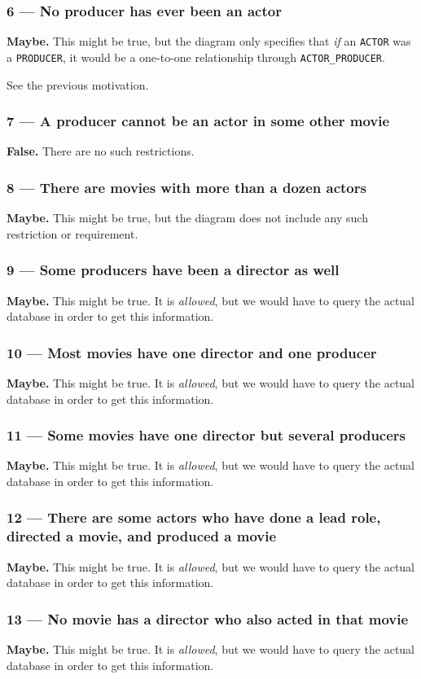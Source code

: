 \subsubsection{6 --- No producer has ever been an actor}
\textbf{Maybe.} This might be true, but the diagram only specifies that
\emph{if} an \texttt{ACTOR} was a \texttt{PRODUCER}, it would be a one-to-one
relationship through \texttt{ACTOR\_PRODUCER}.

See the previous motivation. 

\subsubsection{7 --- A producer cannot be an actor in some other movie}
\textbf{False.} There are no such restrictions.

\subsubsection{8 --- There are movies with more than a dozen actors}
\textbf{Maybe.} This might be true, but the diagram does not include
any such restriction or requirement.

\subsubsection{9 --- Some producers have been a director as well}
\textbf{Maybe.} This might be true. It is \emph{allowed}, but we would have
to query the actual database in order to get this information.

\subsubsection{10 --- Most movies have one director and one producer}
\textbf{Maybe.} This might be true. It is \emph{allowed}, but we would have
to query the actual database in order to get this information.

\subsubsection{11 --- Some movies have one director but several producers}
\textbf{Maybe.} This might be true. It is \emph{allowed}, but we would have
to query the actual database in order to get this information.

\subsubsection{12 --- There are some actors who have done a lead role, directed
               a movie, and produced a movie}
\textbf{Maybe.} This might be true. It is \emph{allowed}, but we would have
to query the actual database in order to get this information.

\subsubsection{13 --- No movie has a director who also acted in that movie}
\textbf{Maybe.} This might be true. It is \emph{allowed}, but we would have
to query the actual database in order to get this information.


